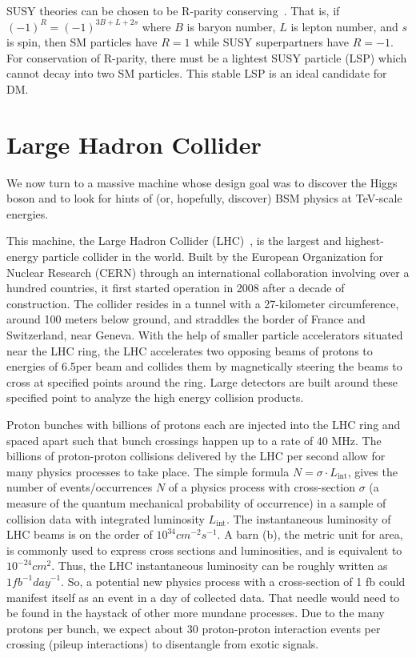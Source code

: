 SUSY theories can be chosen to be R-parity conserving~\cite{THEORY:mohapatra2015}. That is, if $(-1)^{R} =
(-1)^{3B+L+2s}$ where $B$ is baryon number, $L$ is lepton number, and $s$ is
spin, then SM particles have $R=1$ while SUSY superpartners have $R=-1$. For
conservation of R-parity, there must be a lightest SUSY particle (LSP) which
cannot decay into two SM particles. This stable LSP is an ideal candidate for
DM.

\section{Large Hadron Collider}


We now turn to a massive machine whose 
design goal was to discover the Higgs boson and to
look for hints of (or, hopefully, discover) BSM physics
at TeV-scale energies.

This machine, the Large Hadron Collider (LHC)~\cite{LHC:Evans1129806}, is the largest and highest-energy
particle collider in the world.
Built by the European Organization
for Nuclear Research (CERN) through an international collaboration
involving over a hundred countries,
it first started operation in 2008 after a decade of construction. 
The collider resides in a tunnel with a 27-kilometer circumference,
around 100 meters below ground, and straddles the border of
France and Switzerland, near Geneva. With the help of smaller particle
accelerators situated near the LHC ring, the LHC accelerates two opposing 
beams of protons to energies of 6.5\TeV per beam and collides them by
magnetically steering the beams to cross at specified points around the ring. 
Large detectors are built around these specified point to analyze the
high energy collision products.

Proton bunches with billions of protons each are injected into the LHC ring and 
spaced apart such that bunch crossings happen up to a rate of 40 MHz.
The billions of proton-proton collisions delivered by the LHC per second
allow for many physics processes to take place. The simple formula
$N = \sigma \cdot L_\text{int}$,
gives the number of events/occurrences $N$ of a physics process
with cross-section $\sigma$ (a measure of the
quantum mechanical probability of occurrence) 
in a sample of collision data with integrated luminosity
$L_\text{int}$.
The instantaneous luminosity of LHC beams
is on the order of $10^{34} \unit{cm}^{-2} \unit{s}^{-1}$.
A barn (b), the metric unit for area, is commonly used to express cross sections and luminosities,
and is equivalent to $10^{-24} \unit{cm}^2$. Thus, the LHC instantaneous luminosity can
be roughly written as $1 \unit{fb}^{-1} \unit{day}^{-1}$.
So, a potential new physics process with a cross-section of 1 fb could
manifest itself as an event in a day of collected data.
That needle would need to be found in the haystack of 
other more mundane processes. Due to the many protons per bunch,
we expect about 30 proton-proton interaction events per crossing (pileup interactions)
to disentangle from exotic signals.


